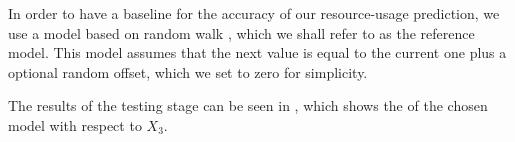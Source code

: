 In order to have a baseline for the accuracy of our resource-usage prediction,
we use a model based on random walk \cite{hastie2009}, which we shall refer to
as the reference model. This model assumes that the next value is equal to the
current one plus a optional random offset, which we set to zero for simplicity.


The results of the testing stage can be seen in , which shows the
 of the chosen model with respect to $X_3$.
